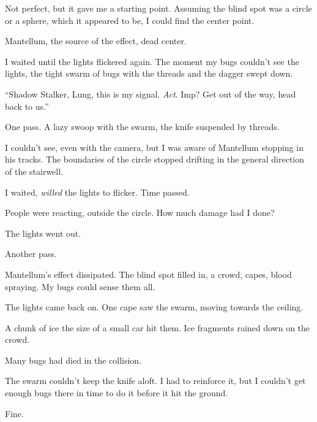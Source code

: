 Not perfect, but it gave me a starting point.  Assuming the blind spot was a circle or a sphere, which it appeared to be, I could find the center point.



Mantellum, the source of the effect, dead center.



I waited until the lights flickered again.  The moment my bugs couldn't see the lights, the tight swarm of bugs with the threads and the dagger swept down.



``Shadow Stalker, Lung, this is my signal.  \emph{Act}.  Imp?  Get out of the way, head back to us.''



One pass.  A lazy swoop with the swarm, the knife suspended by threads.



I couldn't see, even with the camera, but I was aware of Mantellum stopping in his tracks.  The boundaries of the circle stopped drifting in the general direction of the stairwell.



I waited, \emph{willed} the lights to flicker.  Time passed.



People were reacting, outside the circle.  How much damage had I done?



The lights went out.



Another pass.



Mantellum's effect dissipated.  The blind spot filled in, a crowd, capes, blood spraying.  My bugs could sense them all.



The lights came back on.  One cape saw the swarm, moving towards the ceiling.



A chunk of ice the size of a small car hit them.  Ice fragments rained down on the crowd.



Many bugs had died in the collision.



The swarm couldn't keep the knife aloft.  I had to reinforce it, but I couldn't get enough bugs there in time to do it before it hit the ground.



Fine.



